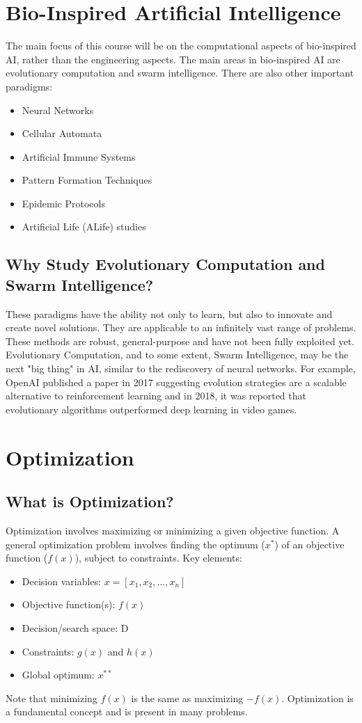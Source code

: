 \section{Bio-Inspired Artificial Intelligence}
The main focus of this course will be on the computational aspects of bio-inspired AI, rather than the engineering aspects. The main areas in bio-inspired AI are evolutionary computation and swarm intelligence. There are also other important paradigms:
\begin{itemize}
    \item Neural Networks
    \item Cellular Automata
    \item Artificial Immune Systems
    \item Pattern Formation Techniques
    \item Epidemic Protocols
    \item Artificial Life (ALife) studies
\end{itemize}

\subsection*{Why Study Evolutionary Computation and Swarm Intelligence?}
These paradigms have the ability not only to learn, but also to innovate and create novel solutions. They are applicable to an infinitely vast range of problems. These methods are robust, general-purpose and have not been fully exploited yet. Evolutionary Computation, and to some extent, Swarm Intelligence, may be the next "big thing" in AI, similar to the rediscovery of neural networks. For example,  OpenAI published a paper in 2017 suggesting evolution strategies are a scalable alternative to reinforcement learning and in 2018, it was reported that evolutionary algorithms outperformed deep learning in video games.

\section{Optimization}
\subsection*{What is Optimization?}
Optimization involves maximizing or minimizing a given objective function. A general optimization problem involves finding the optimum ($x^*$) of an objective function ($f(x)$), subject to constraints. Key elements:
\begin{itemize}
    \item Decision variables: $x = [x_1, x_2, ..., x_n]$
    \item Objective function(s): $f(x)$
    \item Decision/search space: D
    \item Constraints: $g(x)$ and $h(x)$
    \item Global optimum: $x^{**}$
\end{itemize}
Note that minimizing $f(x)$ is the same as maximizing $-f(x)$. Optimization is a fundamental concept and is present in many problems.

